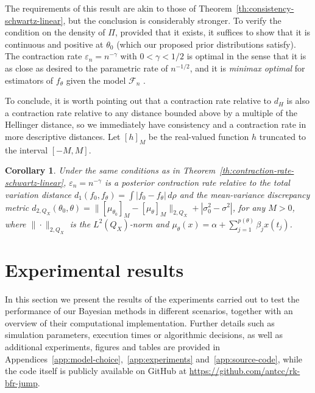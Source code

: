 \documentclass{article}
\numberwithin{equation}{section}
\theoremstyle{plain}
\newtheorem{corollary}[theorem]{Corollary}
\theoremstyle{definition}
\renewcommand{\epsilon}{\varepsilon}
\begin{document}
The requirements of this result are akin to those of Theorem~\ref{th:consistency-schwartz-linear}, but the conclusion is considerably stronger. To verify the condition on the density of \(\Pi\), provided that it exists, it suffices to show that it is continuous and positive at \(\theta_0\) (which our proposed prior distributions satisfy). The contraction rate \(\epsilon_n=n^{-\gamma}\) with \(0<\gamma<1/2\) is optimal in the sense that it is as close as desired to the parametric rate of \(n^{-1/2}\), and it is \textit{minimax optimal} for estimators of \(f_\theta\) given the model \(\mathcal F_n\) \citep[see][p.~198 and references therein]{ghosal2017fundamentals}.

To conclude, it is worth pointing out that a contraction rate relative to \(d_H\) is also a contraction rate relative to any distance bounded above by a multiple of the Hellinger distance, so we immediately have consistency and a contraction rate in more descriptive distances. Let \([h]_M\) be the real-valued function \(h\) truncated to the interval \([-M, M]\).

\begin{corollary}\label{th:corollary-contraction-rate}
  Under the same conditions as in Theorem~\ref{th:contraction-rate-schwartz-linear}, \(\epsilon_n = n^{-\gamma}\) is a posterior contraction rate relative to the total variation distance \(d_1(f_0, f_\theta)=\int |f_0 - f_\theta|\, d\rho\) and the mean-variance discrepancy metric \(d_{2,Q_X}(\theta_0, \theta) = \|[\mu_{\theta_0}]_M - [\mu_\theta]_M\|_{2,Q_X} + |\sigma_0^2 - \sigma^2|\), for any \(M>0\), where \(\|\cdot\|_{2,Q_X}\) is the \(L^2(Q_X)\)-norm and \(\mu_\theta(x)= \alpha + \sum_{j=1}^{p(\theta)} \beta_j x(t_j)\).
\end{corollary}


\section{Experimental results}\label{sec:results}

In this section we present the results of the experiments carried out to test the performance of our Bayesian methods in different scenarios, together with an overview of their computational implementation. Further details such as simulation parameters, execution times or algorithmic decisions, as well as additional experiments, figures and tables are provided in Appendices~\ref{app:model-choice},~\ref{app:experiments} and~\ref{app:source-code}, while the code itself is publicly available on GitHub at \url{https://github.com/antcc/rk-bfr-jump}.
\end{document}
